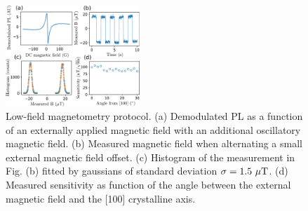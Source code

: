 \documentclass[preprintnumbers,amsmath,amssymb,superscriptaddress,twocolumn,showpacs]{revtex4-2}
\begin{document}
\begin{figure}
\includegraphics[width=0.45\textwidth]{fig_magneto}
\caption{Low-field magnetometry protocol. (a) Demodulated PL as a function of an externally applied magnetic field with an additional oscillatory magnetic field. (b) Measured magnetic field when alternating a small external magnetic field offset. (c) Histogram of the measurement in Fig. (b) fitted by gaussians of standard deviation $\sigma=1.5\ \mu \rm T$. (d) Measured sensitivity as function of the angle between the external magnetic field and the [100] crystalline axis.}
\label{magneto}
\end{figure}
\end{document}
